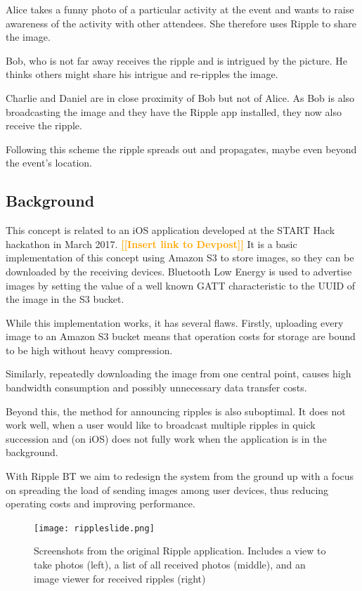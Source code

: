 \documentclass{report}
\newcommand{\todo}[1]{\textsf{\textbf{\textcolor{orange}{[[#1]]}}}}
\newcommand{\lfig}[1]{\label{fig:#1}}
\begin{document}
Alice takes a funny photo of a particular activity at the event and wants to raise awareness of the activity with other attendees. She therefore uses Ripple to share the image.

Bob, who is not far away receives the ripple and is intrigued by the picture. He thinks others might share his intrigue and re-ripples the image.

Charlie and Daniel are in close proximity of Bob but not of Alice. As Bob is also broadcasting the image and they have the Ripple app installed, they now also receive the ripple.

Following this scheme the ripple spreads out and propagates, maybe even beyond the event's location.

\subsection{Background}
This concept is related to an iOS application developed at the START Hack hackathon in March 2017. \todo{Insert link to Devpost} It is a basic implementation of this concept using Amazon S3 to store images, so they can be downloaded by the receiving devices. Bluetooth Low Energy is used to advertise images by setting the value of a well known GATT characteristic to the UUID of the image in the S3 bucket.

While this implementation works, it has several flaws. Firstly, uploading every image to an Amazon S3 bucket means that operation costs for storage are bound to be high without heavy compression.

Similarly, repeatedly downloading the image from one central point, causes high bandwidth consumption and possibly unnecessary data transfer costs.

Beyond this, the method for announcing ripples is also suboptimal. It does not work well, when a user would like to broadcast multiple ripples in quick succession and (on iOS) does not fully work when the application is in the background.

With Ripple BT we aim to redesign the system from the ground up with a focus on spreading the load of sending images among user devices, thus reducing operating costs and improving performance.

\begin{figure}[h]
	\centering
    \texttt{[image: rippleslide.png]}
    \lfig{example}
    \vspace{-5mm} %
	\caption{Screenshots from the original Ripple application. Includes a view to take photos (left), a list of all received photos (middle), and an image viewer for received ripples (right)}
\end{figure}
\end{document}

